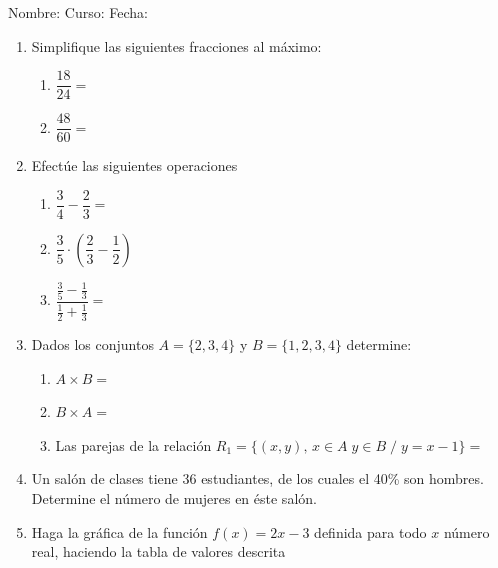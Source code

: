 \documentclass[letterpaper,fleqn]{article}
\newcommand{\LineaNombre}{%
\par
\vspace{\baselineskip}
Nombre:\hrulefill \; Curso: \underline{\hspace*{48pt}} \; Fecha: \underline{\hspace*{2.5cm}} \relax
\par}
\begin{document}
\LineaNombre
\begin{enumerate}
 \item Simplifique las siguientes fracciones al máximo:
 \begin{enumerate}
 \item $\dfrac{18}{24}=$\noanswer
 \item $\dfrac{48}{60}=$\noanswer
 \end{enumerate}
 \item Efectúe las siguientes operaciones
 \begin{enumerate}
 \item $\dfrac{3}{4}-\dfrac{2}{3}=$\noanswer
 \item $\dfrac{3}{5}\cdot \left(\dfrac{2}{3}-\dfrac{1}{2}\right)$\noanswer
 \item $\dfrac{\frac{3}{5}-\frac{1}{3}}{\frac{1}{2}+\frac{1}{3}}=$\noanswer
 \end{enumerate}
 \item Dados los conjuntos $A=\{2,3,4\}$ y $B=\{1,2,3,4\}$ determine:
 \begin{enumerate}
 \item $A \times B=$\noanswer
 \item $B \times A=$\noanswer
 \item Las parejas de la relación $R_{1}=\{(x,y), \, x\in A \; y\in B \; / \; y=x-1\}=$\noanswer
 \newpage
 \end{enumerate}
 \item Un salón de clases tiene 36 estudiantes, de los cuales el 40\% son hombres. Determine el número de mujeres en éste salón.\noanswer
 \item Haga la gráfica de la función $f(x)=2x-3$ definida para todo $x$ número real, haciendo la tabla de valores descrita
 

\end{enumerate}
\end{document}

